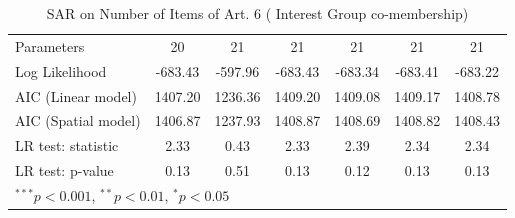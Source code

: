\begin{table}[!h]
\begin{center}
\begin{tabular}{l c c c c c c }
Parameters              & 20           & 21            & 21           & 21           & 21           & 21            \\
Log Likelihood          & -683.43      & -597.96       & -683.43      & -683.34      & -683.41      & -683.22       \\
AIC (Linear model)      & 1407.20      & 1236.36       & 1409.20      & 1409.08      & 1409.17      & 1408.78       \\
AIC (Spatial model)     & 1406.87      & 1237.93       & 1408.87      & 1408.69      & 1408.82      & 1408.43       \\
LR test: statistic      & 2.33         & 0.43          & 2.33         & 2.39         & 2.34         & 2.34          \\
LR test: p-value        & 0.13         & 0.51          & 0.13         & 0.12         & 0.13         & 0.13          \\
\bottomrule
\multicolumn{7}{l}{\scriptsize{$^{***}p<0.001$, $^{**}p<0.01$, $^*p<0.05$}}
\end{tabular}
\caption{SAR on Number of Items of Art. 6 ( Interest Group co-membership)}
\label{table:coefficients}
\end{center}
\end{table}
